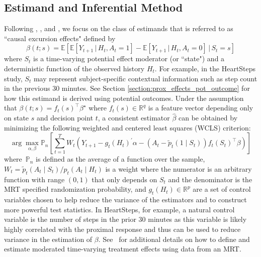 \documentclass[12pt]{article}
\def\E{\mathbb{E}}
\def\given{\, | \,}
\begin{document}
\subsection{Estimand and Inferential Method}
\label{section:standardmrtmethods}

Following \cite{Boruvkaetal}, \cite{Qian2021}, and \cite{DempseyAOAS}, we focus on the class of estimands that is referred to as ``causal excursion effects" defined by
$$
\beta (t;s) = \E \left[ \E \left[ Y_{t+1} \given H_t, A_t = 1 \right] - \E \left[ Y_{t+1} \given H_t, A_t = 0 \right] \given S_t = s\right]
$$
where $S_t$ is a time-varying potential effect moderator (or ``state") and a deterministic function of the observed history $H_t$. For example, in the HeartSteps study, $S_t$ may represent subject-specific contextual information such as step count in the previous 30 minutes.
See Section \ref{section:prox_effects_pot_outcome} for how this estimand is derived using potential outcomes.  Under the assumption that $\beta(t;s) = f_t(s)^\top \beta^\star$ where $f_t(s) \in \mathbb{R}^q$ is a feature vector depending only on state $s$ and decision point $t$, a consistent estimator $\hat \beta$ can be obtained by minimizing the following weighted and centered least squares (WCLS) criterion:
\begin{equation}
\label{eq:mrtstandard}
\arg \max_{\alpha, \beta} \mathbb{P}_n \left[ \sum_{t=1}^T W_t \left( Y_{t+1} - g_t(H_t)^\prime \alpha - (A_t - \tilde p_t (1\textbf{} \mid S_t)) f_t (S_t)^\top \beta \right) \right]
\end{equation}
where~$\mathbb{P}_n$ is defined as the average of a function over the sample, $W_t = \tilde p_t (A_t \mid S_t) / p_t (A_t \mid H_t)$ is a weight where the numerator is an arbitrary function with range $(0,1)$ that only depends on $S_t$ and the denominator is the MRT specified randomization probability, and $g_t(H_t) \in \mathbb{R}^p$ are a set of control variables chosen to help reduce the variance of the estimators and to construct more powerful test statistics. In HeartSteps, for example, a natural control variable is the number of steps in the prior 30 minutes as this variable is likely highly correlated with the proximal response and thus can be used to reduce variance in the estimation of $\beta$. See~\cite{Boruvkaetal} for additional details on how to define and estimate moderated time-varying treatment effects using data from an MRT.
\end{document}
